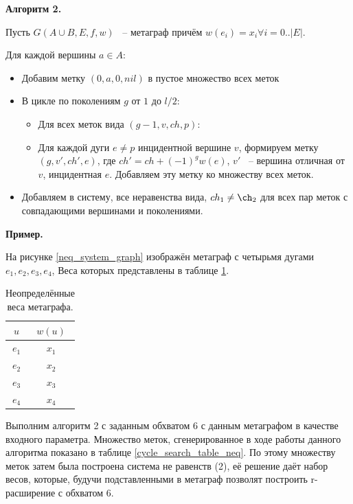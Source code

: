 \documentclass[14pt]{mmcs-article}
\begin{document}
\textbf{Алгоритм 2.}

Пусть $G(A \cup B, E, f, w)$ ~-- метаграф причём $w(e_i) = x_i \forall i = 0..|E|$.

Для каждой вершины $a \in A$:

\begin{itemize}
    \item Добавим метку $(0, a, 0, nil)$ в пустое множество всех меток
    \item В цикле по поколениям $g$ от $1$ до $l / 2$:
    \begin{itemize}
        \item Для всех меток вида $(g - 1, v, ch, p)$:
        \item
            Для каждой дуги $e \not= p$ инцидентной вершине $v$,
            формируем метку $(g, v', ch', e)$, где $ch' = ch + (-1)^{g} w(e)$, $v'$ ~-- вершина отличная от $v$, инцидентная $e$.
            Добавляем эту метку ко множеству всех меток.
    \end{itemize}
    \item Добавляем в систему, все неравенства вида, $ch_1 \neq \ch_2$ для всех пар меток с совпадающими вершинами и поколениями.
\end{itemize}

\textbf{Пример.}

На рисунке \ref{neq_system_graph} изображён метаграф с четырьмя дугами $e_1, e_2, e_3, e_4$, Веса которых представлены в таблице \ref{neq_cycle_mod_search_weights}. 

\begin{table}[H]
    \centering
    \begin{tabular}{ | c | c | }
        \hline
        $u$   & $w(u)$ \\ \hline
        $e_1$ & $x_1$  \\
        $e_2$ & $x_2$  \\
        $e_3$ & $x_3$  \\
        $e_4$ & $x_4$  \\ \hline
    \end{tabular}
    \caption{ Неопределённые веса метаграфа. }\label{neq_cycle_mod_search_weights}
\end{table}

Выполним алгоритм 2 с заданным обхватом 6 с данным метаграфом в качестве входного параметра. Множество меток, сгенерированное в ходе работы данного алгоритма показано в таблице \ref{cycle_search_table_neq}. По этому множеству меток затем была построена система не равенств (2), её решение даёт набор весов, которые, будучи подставленными в метаграф позволят построить r-расширение с обхватом 6.
\end{document}
